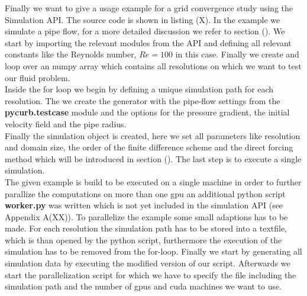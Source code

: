Finally we want to give a usage example for a grid convergence study using
the Simulation API. The source code is shown in listing (X).
In the example we simulate a pipe flow, for a more detailed discussion we refer to section ().
We start by importing the relevant modules from the API and defining all relevant constants like the
Reynolds number, $Re=100$ in this case.
Finally we create and loop over an numpy array which contains all resolutions on which we want to test
our fluid problem.\\
Inside the for loop we begin by defining a unique simulation path for each resolution.
The we create the generator with the pipe-flow settings from the \textbf{pycurb.testcase} module and
the options for the pressure gradient, the initial velocity field and the pipe radius.\\
Finally the simulation object is created, here we set all parameters like resolution and domain size,
the order of the finite difference scheme and the direct forcing method which will be introduced in section ().
The last step is to execute a single simulation.\\
The given example is build to be executed on a single machine in order to further parallize the computations on
more than one gpu an additional python script \textbf{worker.py} was written which is not yet included in the simulation API (see Appendix A(XX)).
To parallelize the example some small adaptions has to be made. For each resolution the simulation path has to be stored into a textfile, which
is than opened by the python script, furthermore the execution of the simulation has to be removed from the for-loop.
Finally we start by generating all simulation data by executing the modified version of our script. Afterwards we start
the parallelization script for which we have to specify the file including the simulation path and the number of gpus and cuda machines we want to use.

